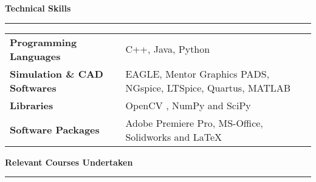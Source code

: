 \documentclass[11pt]{article}%
\begin{document}

\begin{center}
\bf{\Large{Technical Skills}}
\end{center}
\hrule
\vspace{2mm}
\begin{tabular}{l l}

\textbf{Programming Languages} & C++, Java, Python \vspace{4pt}\\
\textbf{Simulation \& CAD Softwares} &EAGLE, Mentor Graphics PADS, NGspice, LTSpice, Quartus, MATLAB \vspace{4pt}\\
\textbf{Libraries} & OpenCV , NumPy and SciPy\vspace{4pt}\\

\textbf{Software Packages} & Adobe Premiere Pro, MS-Office, Solidworks and \LaTeX  \vspace{4pt}\\%

	
\end{tabular}
\vspace{-9pt}


\begin{center}
\bf{\Large{Relevant Courses Undertaken}}
\end{center}
\hrule
\vspace{2mm}

\vspace{-3pt}
\vspace{-1mm}
\end{document}
